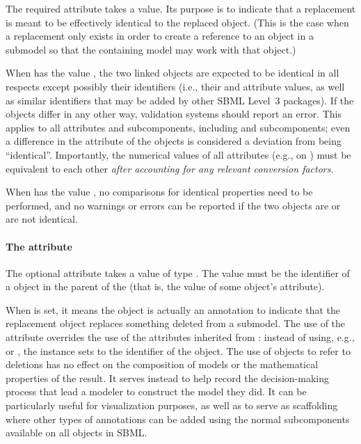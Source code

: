 The required attribute  takes a 
value.  Its purpose is to indicate that a replacement is meant to be
effectively identical to the replaced object.  (This is the case when a
replacement only exists in order to create a reference to an object in a
submodel so that the containing model may work with that object.)

When  has the value , the two linked objects
are expected to be identical in all respects except possibly their
identifiers (i.e., their  and  attribute values,
as well as similar identifiers that may be added by other SBML Level~3
packages).  If the objects differ in any other way, validation systems
should report an error.  This applies to all attributes and
subcomponents, including \Annotation and \Notes subcomponents; even a
difference in the  attribute of the objects is considered a
deviation from being ``identical''.  Importantly, the numerical values
of all attributes (e.g.,  on \Species) must be
equivalent to each other \emph{after accounting for any relevant
 conversion factors}.

When  has the value , no comparisons for
identical properties need to be performed, and no warnings or errors can
be reported if the two objects are or are not identical.


\paragraph{The \hspace*{1pt} attribute}
\label{replacedelement-deletion}

The optional attribute  takes a value of type
.  The value must be the identifier of a \Deletion object in
the parent \Model of the \ReplacedElement (that is, the value of some \Deletion object's 
attribute).  

When  is set, it means the \ReplacedElement object is
actually an annotation to indicate that the replacement object replaces
something deleted from a submodel.  The use of the 
attribute overrides the use of the attributes inherited from \SBaseRef:
instead of using, e.g.,  or , the
\ReplacedElement instance sets  to the identifier of the
\Deletion object.  The use of \ReplacedElement objects to refer to
deletions has no effect on the composition of models or the mathematical
properties of the result.  It serves instead to help record the
decision-making process that lead a modeler to construct the model they
did.  It can be particularly useful for visualization purposes, as well
as to serve as scaffolding where other types of annotations can be added
using the normal \Annotation subcomponents available on all \SBase
objects in SBML.

